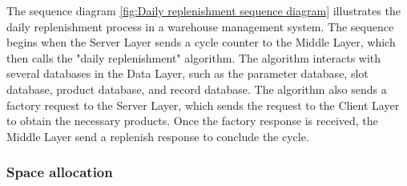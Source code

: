 The sequence diagram \autoref{fig:Daily replenishment sequence diagram} illustrates the daily replenishment process in a warehouse management system. The sequence begins when the Server Layer sends a cycle counter to the Middle Layer, which then calls the "daily replenishment" algorithm. The algorithm interacts with several databases in the Data Layer, such as the parameter database, slot database, product database, and record database. The algorithm also sends a factory request to the Server Layer, which sends the request to the Client Layer to obtain the necessary products. Once the factory response is received, the Middle Layer send a replenish response to conclude the cycle.

\subsubsection{Space allocation}

